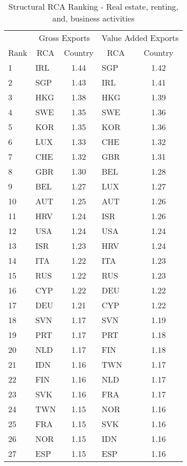 \begin{table}[H]
\scriptsize
\centering\caption{Structural RCA Ranking - Real estate, renting,
and, business activities}
\label{tab:rank}
\begin{tabular}{llclc} \toprule
   &     \multicolumn{2}{c}{Gross Exports}&                \multicolumn{2}{c}{ Value Added Exports}    \\            
        \multicolumn{1}{c}{Rank} &        \multicolumn{1}{c}{RCA} &          \multicolumn{1}{c}{Country} &           \multicolumn{1}{c}{RCA} &          \multicolumn{1}{c}{Country}    \\    \midrule
1 & IRL & 1.44 & SGP & 1.42 \\ 
  2 & SGP & 1.43 & IRL & 1.41 \\ 
  3 & HKG & 1.38 & HKG & 1.39 \\ 
  4 & SWE & 1.35 & SWE & 1.36 \\ 
  5 & KOR & 1.35 & KOR & 1.36 \\ 
  6 & LUX & 1.33 & CHE & 1.32 \\ 
  7 & CHE & 1.32 & GBR & 1.31 \\ 
  8 & GBR & 1.30 & BEL & 1.28 \\ 
  9 & BEL & 1.27 & LUX & 1.27 \\ 
  10 & AUT & 1.25 & AUT & 1.26 \\ 
  11 & HRV & 1.24 & ISR & 1.26 \\ 
  12 & USA & 1.24 & USA & 1.24 \\ 
  13 & ISR & 1.23 & HRV & 1.24 \\ 
  14 & ITA & 1.22 & ITA & 1.23 \\ 
  15 & RUS & 1.22 & RUS & 1.23 \\ 
  16 & CYP & 1.22 & DEU & 1.22 \\ 
  17 & DEU & 1.21 & CYP & 1.22 \\ 
  18 & SVN & 1.17 & SVN & 1.19 \\ 
  19 & PRT & 1.17 & PRT & 1.18 \\ 
  20 & NLD & 1.17 & FIN & 1.18 \\ 
  21 & IDN & 1.16 & TWN & 1.17 \\ 
  22 & FIN & 1.16 & NLD & 1.17 \\ 
  23 & SVK & 1.16 & FRA & 1.17 \\ 
  24 & TWN & 1.15 & NOR & 1.16 \\ 
  25 & FRA & 1.15 & SVK & 1.16 \\ 
  26 & NOR & 1.15 & IDN & 1.16 \\ 
  27 & ESP & 1.15 & ESP & 1.16 \\ 

\end{tabular}
\end{table}
